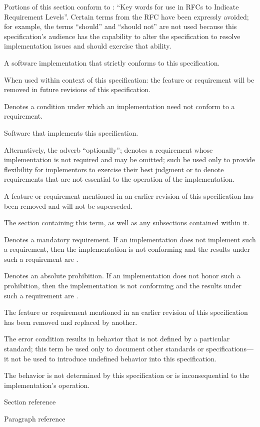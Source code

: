 %

Portions of this section conform to : ``Key words for use in RFCs to
Indicate Requirement Levels''. Certain terms from the RFC have been expressly
avoided; for example, the terms ``should'' and ``should not'' are not used
because this specification's audience has the capability to alter the
specification to resolve implementation issues and should exercise that ability.

\begin{description}
  A software implementation that strictly conforms to this specification.

  When used within context of this specification: the feature or requirement
  will be removed in future revisions of this specification.

  Denotes a condition under which an implementation need not conform to a
  requirement.

  Software that implements this specification.

  Alternatively, the adverb ``optionally''; denotes a requirement whose
  implementation is not required and may be omitted; such \shall be used only to
  provide flexibility for implementors to exercise their best judgment or to
  denote requirements that are not essential to the operation of the
  implementation.

  A feature or requirement mentioned in an earlier revision of this
  specification has been removed and will not be superseded.

  The section containing this term, as well as any subsections contained within
  it.

  Denotes a mandatory requirement. If an implementation does not implement such
  a requirement, then the implementation is not conforming and the results under
  such a requirement are \undefined.

  Denotes an absolute prohibition. If an implementation does not honor such a
  prohibition, then the implementation is not conforming and the results under
  such a requirement are \undefined.

  The feature or requirement mentioned in an earlier revision of this
  specification has been removed and replaced by another.

  The error condition results in behavior that is not defined by a particular
  standard; this term \shall be used only to document other standards or
  specifications---it \shall not be used to introduce undefined behavior into
  this specification.

  The behavior is not determined by this specification or is inconsequential to
  the implementation's operation.

  \dt{\S}
  Section reference

  \dt{\P}
  Paragraph reference
\end{description}
